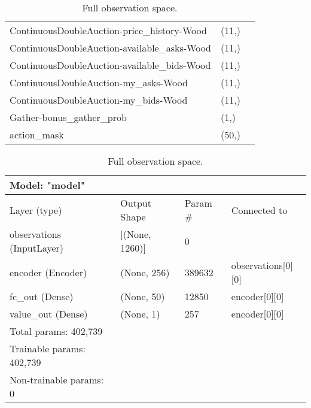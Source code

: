\begin{table}[]
\begin{tabular}{lll}
    ContinuousDoubleAuction-price\_history-Wood   & (11,)       &                             \\ 
    ContinuousDoubleAuction-available\_asks-Wood  & (11,)       &                             \\ 
    ContinuousDoubleAuction-available\_bids-Wood  & (11,)       &                             \\ 
    ContinuousDoubleAuction-my\_asks-Wood         & (11,)       &                             \\ 
    ContinuousDoubleAuction-my\_bids-Wood         & (11,)       &                             \\ 
    Gather-bonus\_gather\_prob                    & (1,)        &                             \\ 
    action\_mask                                  & (50,)       &                             \\ \hline
    \end{tabular}
    \caption{\label{tab:full_obs} Full observation space.}
\end{table}



\begin{table}[]
    \begin{tabular}{llll}
	Model: "model"            &                    &          &                            \\ \hline
	Layer (type)              & Output Shape       & Param \# & Connected to               \\ \hline
	observations (InputLayer) & {[}(None, 1260){]} & 0        &                            \\ \hline
	encoder (Encoder)         & (None, 256)        & 389632   & observations{[}0{]}{[}0{]} \\ \hline
	fc\_out (Dense)           & (None, 50)         & 12850    & encoder{[}0{]}{[}0{]}      \\ \hline
	value\_out (Dense)        & (None, 1)          & 257      & encoder{[}0{]}{[}0{]}      \\ \hline
	Total params: 402,739     &                    &          &                            \\
	Trainable params: 402,739 &                    &          &                            \\
	Non-trainable params: 0   &                    &          &                            \\ \hline
    \end{tabular}
    \caption{\label{tab:full_obs} Full observation space.}
\end{table}
